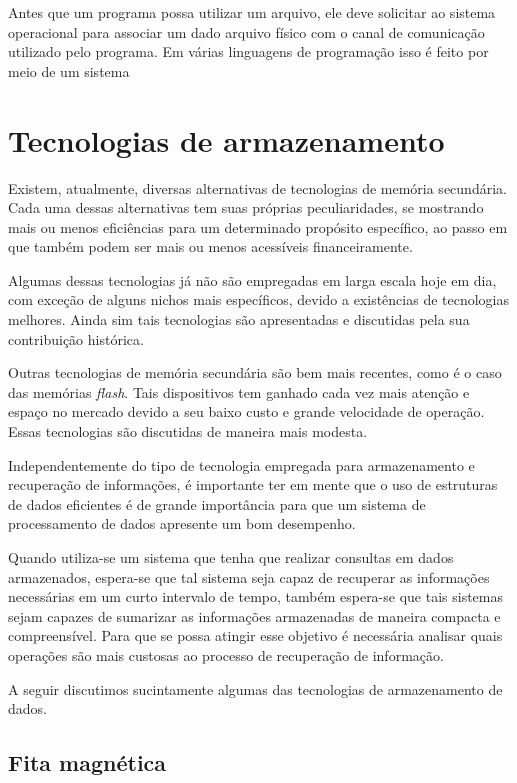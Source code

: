 \documentclass[a4paper,11pt]{book}
\begin{document}
   Antes que um programa possa utilizar um arquivo, ele deve solicitar ao sistema operacional para associar um dado arquivo físico com 
   o canal de comunicação utilizado pelo programa. Em várias linguagens de programação isso é feito por meio de um sistema 
   
   \section{Tecnologias de armazenamento}  
   
   Existem, atualmente, diversas alternativas de tecnologias de memória secundária. Cada uma dessas alternativas tem suas próprias peculiaridades,
   se mostrando mais ou menos eficiências para um determinado propósito específico, ao passo em que também podem ser mais ou menos acessíveis financeiramente.
    
   Algumas dessas tecnologias já não são empregadas em larga escala hoje em dia, com exceção de alguns nichos mais específicos, 
   devido a existências de tecnologias melhores. Ainda sim tais tecnologias são apresentadas e discutidas pela sua contribuição histórica.
   
   Outras tecnologias de memória secundária são bem mais recentes, como é o caso das memórias \emph{flash}. Tais dispositivos tem ganhado cada
   vez mais atenção e espaço no mercado devido a seu baixo custo e grande velocidade de operação. Essas tecnologias são discutidas de maneira 
   mais modesta.
   
   Independentemente do tipo de tecnologia empregada para armazenamento e recuperação de informações, é importante ter em mente que o uso de
   estruturas de dados eficientes é de grande importância para que um sistema de processamento de dados apresente um bom desempenho. 
   
   Quando utiliza-se um sistema que tenha que realizar consultas em dados armazenados, espera-se que tal sistema seja capaz de recuperar
   as informações necessárias em um curto intervalo de tempo, também espera-se que tais sistemas sejam capazes de sumarizar as informações
   armazenadas de maneira compacta e compreensível.  Para que se possa atingir esse objetivo é necessária analisar quais operações são
   mais custosas ao processo de recuperação de informação. 
   
   
   A seguir discutimos sucintamente algumas das tecnologias de armazenamento de dados.
   
 
   
   
   \subsection{Fita magnética}
     
\end{document}
